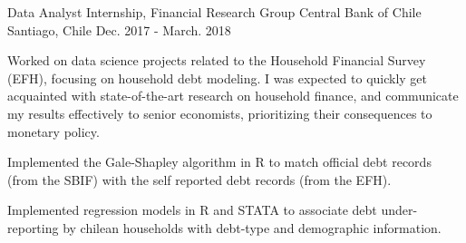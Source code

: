 \begin{cventries}
  \cventry
    {Data Analyst Internship, Financial Research Group} %
    {Central Bank of Chile} %
    {Santiago, Chile} %
    {Dec. 2017 - March. 2018} %
    {
      \begin{cvitems} %
        \item {Worked on data science projects related to the Household Financial Survey (EFH), focusing on household debt modeling. I was expected to
        quickly get acquainted with state-of-the-art research on household finance, and communicate my results effectively to senior economists, prioritizing their consequences to monetary policy.}
        \item {Implemented the Gale-Shapley algorithm in R to match official debt records (from the SBIF) with the self reported debt records (from the EFH).}
        \item {Implemented regression models in R and STATA to associate debt under-reporting by chilean households with debt-type and demographic information.}
      \end{cvitems}
    }
\end{cventries}
